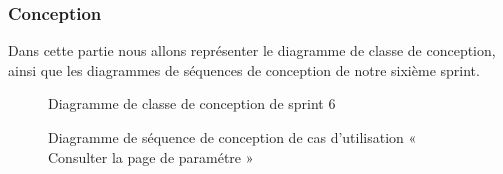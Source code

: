 \subsubsection{Conception}
Dans cette partie nous allons représenter le diagramme de classe de conception, ainsi que les diagrammes de séquences de conception de notre sixième sprint.

\begin{landscape}


\begin{figure}[H]
  \centering
  \caption{Diagramme de classe de conception de sprint 6}
  \label{fig:class_diagram_61}
\end{figure}
\end{landscape}


\begin{figure}[H]
  \centering
  \caption{Diagramme de séquence de conception de cas d'utilisation « Consulter la page de paramétre »}
  \label{fig:conception_sequence_consult_settings_page}
\end{figure}

